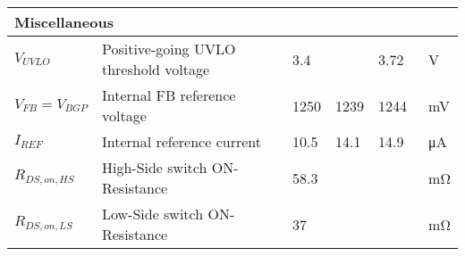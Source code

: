 \begin{table}[h!]
\begin{tabular}{|l|l|l|l|l|l|}
    \multicolumn{6}{|l|}{\textbf{Miscellaneous}} \\ \hline
    $V_{UVLO}$  & Positive-going UVLO threshold voltage & 3.4  &   &  3.72 &   \qty{}{\volt}  \\ \hline
    $V_{FB} = V_{BGP}$  & Internal FB reference voltage  & 1250  & 1239  & 1244 &   \qty{}{\milli\volt}  \\ \hline
    $I_{REF}$  & Internal reference current  & 10.5  & 14.1  & 14.9 &   \qty{}{\micro\ampere}  \\ \hline
    $R_{DS,on,HS}$ & High-Side switch ON-Resistance &   58.3 &   &     & \qty{}{\milli\ohm}\\ \hline 
    $R_{DS,on,LS}$ & Low-Side switch ON-Resistance &   37 &   &     & \qty{}{\milli\ohm}\\ \hline 
    \end{tabular}
\end{table}